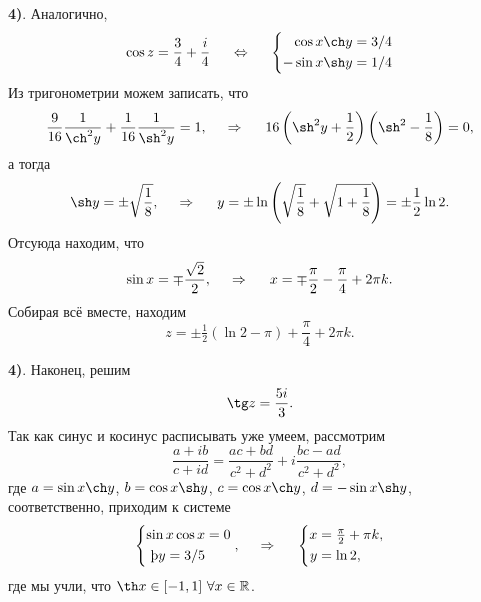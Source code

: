 \textbf{4)}. Аналогично,
\begin{equation*}
    \cos z = \frac{3}{4} + \frac{i}{4}
    \hspace{5 mm} \Leftrightarrow \hspace{5 mm} 
    \left\{\begin{aligned}
        \cos x \ch y &=  3/4 \\
        - \sin x \sh y &= 1/4        
    \end{aligned}\right.
\end{equation*}
Из тригонометрии можем записать, что
\begin{equation*}
    \frac{9}{16} \frac{1}{\ch^2 y} + \frac{1}{16} \frac{1}{\sh^2 y} =1,
    \hspace{0.5cm} \Rightarrow \hspace{0.5cm}
    16 \left(\sh^2 y + \frac{1}{2}\right) \left(\sh^2 - \frac{1}{8}\right) = 0,
\end{equation*}
а тогда
\begin{equation*}
    \sh y = \pm \sqrt{\frac{1}{8}},
    \hspace{0.5cm} \Rightarrow \hspace{0.5cm}
    y = \pm \ln \left(\sqrt{\frac{1}{8}} +\sqrt{1 + \frac{1}{8}}\right) = \pm \frac{1}{2} \ln 2.
\end{equation*}
Отсуюда находим, что
\begin{equation*}
    \sin x = \mp \frac{\sqrt{2}}{2},
    \hspace{0.5cm} \Rightarrow \hspace{0.5cm}
    x = \mp \frac{\pi}{2} - \frac{\pi}{4} + 2 \pi k.
\end{equation*}
Собирая всё вместе, находим
\begin{equation*}
    z = \pm \tfrac{1}{2}\left(\ln 2 - \pi\right) + \frac{\pi}{4} + 2 \pi k.
\end{equation*}


\textbf{4)}. Наконец, решим
\begin{equation*}
    \tg z = \frac{5i}{3}.
\end{equation*}
Так как синус и косинус расписывать уже умеем, рассмотрим
\begin{equation*}
    \frac{a + i b}{c + i d} = 
    \frac{a c + b d}{c^2 + d^2} + i \frac{bc - ad}{c^2 + d^2},
\end{equation*}
где $a = \sin x \ch y$, $b = \cos x \sh y$, $c = \cos x \ch y$, $d = - \sin x \sh y$, соответственно, приходим к системе
\begin{equation*}
    \left\{\begin{aligned}
        \sin x  \cos x &= 0 \\
        \th y = 3/5
    \end{aligned}\right.,
    \hspace{0.5cm} \Rightarrow \hspace{0.5cm}   
    \left\{\begin{aligned}
        x &= \tfrac{\pi}{2} + \pi k, \\
        y &= \ln 2, \\
    \end{aligned}\right.
\end{equation*}
где мы учли, что $\th x \in [-1, 1] \ \forall x \in \mathbb{R}$. 


